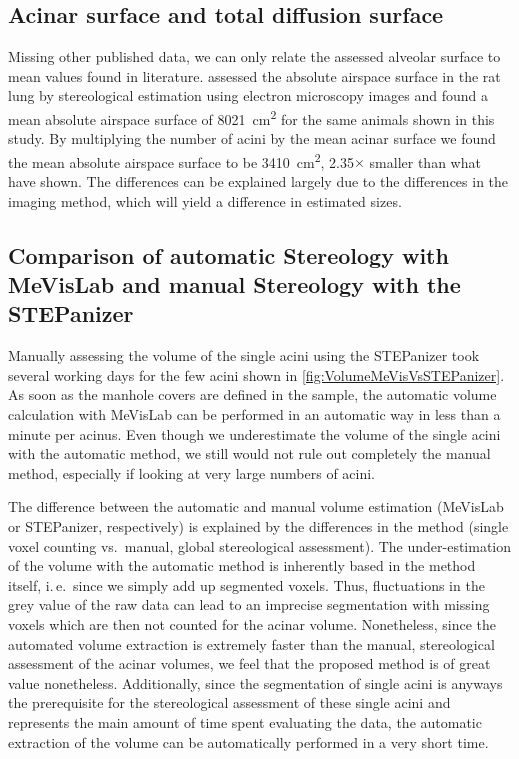 \documentclass[twoside,paper=a4,abstract=true,english,DIV=calc]{scrartcl}
\newcommand{\ie}{i.\,e.\ }
\newcommand{\meanairspacesurface}{3410} %
\newcommand{\airspacedifference}{2.35} %
\begin{document}
\subsection{Acinar surface and total diffusion surface}
Missing other published data, we can only relate the assessed alveolar surface to mean values found in literature. \cite{Tschanz2003} assessed the absolute airspace surface in the rat lung by stereological estimation using electron microscopy images and found a mean absolute airspace surface of \SI{8021}{\centi\metre\squared} for the same animals shown in this study. By multiplying the number of acini by the mean acinar surface we found the mean absolute airspace surface to be \SI{\meanairspacesurface}{\centi\metre\squared}, \airspacedifference\(\times\) smaller than what \citet{Tschanz2003} have shown. The differences can be explained largely due to the differences in the imaging method, which will yield a difference in estimated sizes.

\subsection[Comparison of MeVisLab with STEPanizer]{Comparison of automatic Stereology with MeVisLab and manual Stereology with the STEPanizer}
Manually assessing the volume of the single acini using the STEPanizer took several working days for the few acini shown in \autoref{fig:VolumeMeVisVsSTEPanizer}. As soon as the manhole covers are defined in the sample, the automatic volume calculation with MeVisLab can be performed in an automatic way in less than a minute per acinus. Even though we underestimate the volume of the single acini with the automatic method, we still would not rule out completely the manual method, especially if looking at very large numbers of acini.

The difference between the automatic and manual volume estimation (MeVisLab or STEPanizer, respectively) is explained by the differences in the method (single voxel counting vs.\ manual, global stereological assessment). The under-estimation of the volume with the automatic method is inherently based in the method itself, \ie since we simply add up segmented voxels. Thus, fluctuations in the grey value of the raw data can lead to an imprecise segmentation with missing voxels which are then not counted for the acinar volume. Nonetheless, since the automated volume extraction is extremely faster than the manual, stereological assessment of the acinar volumes, we feel that the proposed method is of great value nonetheless. Additionally, since the segmentation of single acini is anyways the prerequisite for the stereological assessment of these single acini and represents the main amount of time spent evaluating the data, the automatic extraction of the volume can be automatically performed in a very short time.
\end{document}
